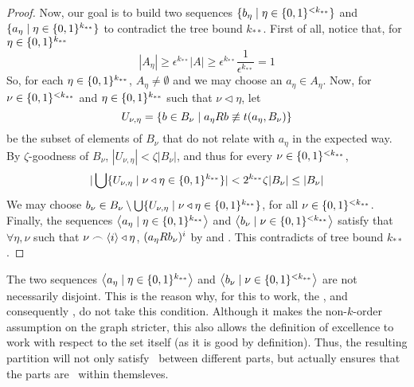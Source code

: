 \begin{lemma}[Claim 5.4]
\begin{proof}
            Now, our goal is to build two sequences $\{ b_\eta \mid \eta \in \{ 0,1 \}^{<k_{**}} \}$ and
            $\{ a_\eta \mid \eta \in \{ 0,1 \}^{k_{**}} \}$ to contradict the tree bound $k_{**}$.
            First of all, notice that, for $\eta \in \{ 0,1 \}^{k_{**}}$
            \[
                |A_\eta| \geq \epsilon^{k_{**}} |A| \geq
                \epsilon^{k_{**}} \frac{1}{\epsilon^{k_{**}}} = 1
            \]
            So, for each $\eta \in \{ 0,1 \}^{k_{**}}$, $A_\eta \neq \emptyset$ and we may choose an $a_\eta \in A_\eta$.
            Now, for $\nu \in \{ 0,1 \}^{<k_{**}}$ and $\eta \in \{ 0,1 \}^{k_{**}}$ such that $\nu \triangleleft \eta$, let
            \[
                U_{\nu,\eta} = \{ b \in B_\nu \mid a_\eta R b \not\equiv t(a_\eta, B_\nu) \}
            \]
            be the subset of elements of $B_\nu$ that do not relate with $a_\eta$ in the expected way.
            By $\zeta$-goodness of $B_\nu$, $|U_{\nu, \eta}| < \zeta |B_\nu|$, and thus for every $\nu \in \{ 0,1 \}^{<k_{**}}$,
            \[
                | \bigcup\{  U_{\nu,\eta} \mid \nu \triangleleft \eta \in \{ 0,1 \}^{k_{**}} \} | <
                2^{k_{**}} \zeta |B_\nu| \leq |B_\nu|
            \]
            We may choose $b_\nu \in B_\nu \setminus \bigcup\{ U_{\nu,\eta} \mid \nu \triangleleft \eta \in \{ 0,1 \}^{k_{**}} \}$,
            for all $\nu \in \{ 0,1 \}^{<k_{**}}$.
            Finally, the sequences $\left< a_\eta \mid \eta \in \{ 0,1 \}^{k_{**}} \right>$ and $\left< b_\nu \mid \nu \in \{ 0,1 \}^{<k_{**}} \right>$
            satisfy that $\forall \eta, \nu$ such that $\nu \frown \left< i \right> \triangleleft \eta$, $( a_\eta R b_\nu )^i$
            by  and .
            This contradicts  of tree bound $k_{**}$.
        \end{proof}
    \end{lemma}

    \begin{remark}
        The two sequences $\left< a_\eta \mid \eta \in \{ 0,1 \}^{k_{**}} \right>$ and $\left< b_\nu \mid \nu \in \{ 0,1 \}^{<k_{**}} \right>$
        are not necessarily disjoint.
        This is the reason why, for this to work, the , and consequently ,
        do not take this condition.
        Although it makes the non-$k$-order assumption on the graph stricter, this also allows the definition of excellence
        to work with respect to the set itself (as it is good by definition).
        Thus, the resulting partition will not only satisfy \regularity~between different parts, but actually ensures
        that the parts are \regular~within themsleves.
    \end{remark}

